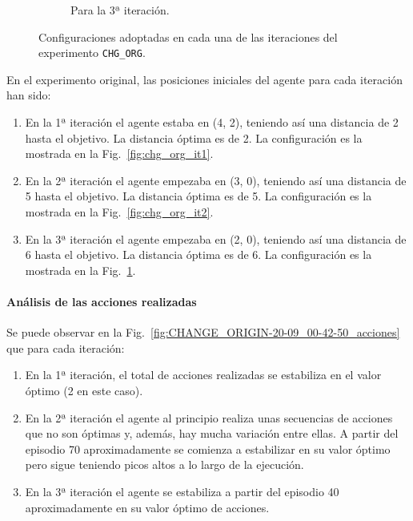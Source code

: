 \begin{figure}
\begin{subfigure}{.35\textwidth}
        \caption{Para la 3ª iteración.}
        \label{fig:chg_org_it3}
    \end{subfigure}%
    \caption{Configuraciones adoptadas en cada una de las iteraciones del experimento \texttt{CHG\_ORG}.}
    \label{fig:chg_org_config}
\end{figure}

En el experimento original, las posiciones iniciales del agente para cada iteración han sido: 

\begin{enumerate}
    \item En la 1ª iteración el agente estaba en (4, 2), teniendo así una distancia de 2 hasta el objetivo. La distancia óptima es de 2. La configuración es la mostrada en la Fig.~\ref{fig:chg_org_it1}.
    \item En la 2ª iteración el agente empezaba en (3, 0), teniendo así una distancia de 5 hasta el objetivo. La distancia óptima es de 5.  La configuración es la mostrada en la Fig.~\ref{fig:chg_org_it2}.
    \item En la 3ª iteración el agente empezaba en (2, 0), teniendo así una distancia de 6 hasta el objetivo. La distancia óptima es de 6.  La configuración es la mostrada en la Fig.~\ref{fig:chg_org_it3}.
\end{enumerate}

\paragraph{Análisis de las acciones realizadas}

Se puede observar en la Fig.~\ref{fig:CHANGE_ORIGIN-20-09_00-42-50_acciones} que para cada iteración: 
\begin{enumerate}
    \item En la 1ª iteración, el total de acciones realizadas se estabiliza en el valor óptimo (2 en este caso). 
    \item En la 2ª iteración el agente al principio realiza unas secuencias de acciones que no son óptimas y, además, hay mucha variación entre ellas. A partir del episodio 70 aproximadamente se comienza a estabilizar en su valor óptimo pero sigue teniendo picos altos a lo largo de la ejecución. 
    \item En la 3ª iteración el agente se estabiliza a partir del episodio 40 aproximadamente en su valor óptimo de acciones.  
\end{enumerate}

